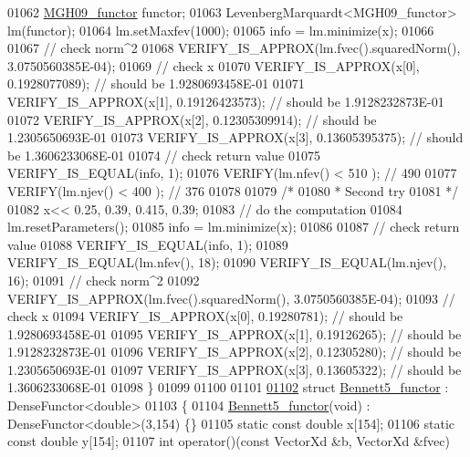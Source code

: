 \begin{DoxyCode}
01062   \hyperlink{struct_m_g_h09__functor}{MGH09\_functor} functor;
01063   LevenbergMarquardt<MGH09\_functor> lm(functor);
01064   lm.setMaxfev(1000);
01065   info = lm.minimize(x);
01066 
01067   \textcolor{comment}{// check norm^2}
01068   VERIFY\_IS\_APPROX(lm.fvec().squaredNorm(), 3.0750560385E-04);
01069   \textcolor{comment}{// check x}
01070   VERIFY\_IS\_APPROX(x[0], 0.1928077089); \textcolor{comment}{// should be 1.9280693458E-01}
01071   VERIFY\_IS\_APPROX(x[1], 0.19126423573); \textcolor{comment}{// should be 1.9128232873E-01}
01072   VERIFY\_IS\_APPROX(x[2], 0.12305309914); \textcolor{comment}{// should be 1.2305650693E-01}
01073   VERIFY\_IS\_APPROX(x[3], 0.13605395375); \textcolor{comment}{// should be 1.3606233068E-01}
01074   \textcolor{comment}{// check return value}
01075   VERIFY\_IS\_EQUAL(info, 1); 
01076   VERIFY(lm.nfev() < 510 ); \textcolor{comment}{// 490}
01077   VERIFY(lm.njev() < 400 ); \textcolor{comment}{// 376}
01078 
01079   \textcolor{comment}{/*}
01080 \textcolor{comment}{   * Second try}
01081 \textcolor{comment}{   */}
01082   x<< 0.25, 0.39, 0.415, 0.39;
01083   \textcolor{comment}{// do the computation}
01084   lm.resetParameters();
01085   info = lm.minimize(x);
01086 
01087   \textcolor{comment}{// check return value}
01088   VERIFY\_IS\_EQUAL(info, 1);
01089   VERIFY\_IS\_EQUAL(lm.nfev(), 18);
01090   VERIFY\_IS\_EQUAL(lm.njev(), 16);
01091   \textcolor{comment}{// check norm^2}
01092   VERIFY\_IS\_APPROX(lm.fvec().squaredNorm(), 3.0750560385E-04);
01093   \textcolor{comment}{// check x}
01094   VERIFY\_IS\_APPROX(x[0], 0.19280781); \textcolor{comment}{// should be 1.9280693458E-01}
01095   VERIFY\_IS\_APPROX(x[1], 0.19126265); \textcolor{comment}{// should be 1.9128232873E-01}
01096   VERIFY\_IS\_APPROX(x[2], 0.12305280); \textcolor{comment}{// should be 1.2305650693E-01}
01097   VERIFY\_IS\_APPROX(x[3], 0.13605322); \textcolor{comment}{// should be 1.3606233068E-01}
01098 \}
01099 
01100 
01101 
\hyperlink{struct_bennett5__functor}{01102} \textcolor{keyword}{struct }\hyperlink{struct_bennett5__functor}{Bennett5\_functor} : DenseFunctor<double>
01103 \{
01104     \hyperlink{struct_bennett5__functor}{Bennett5\_functor}(\textcolor{keywordtype}{void}) : DenseFunctor<double>(3,154) \{\}
01105     \textcolor{keyword}{static} \textcolor{keyword}{const} \textcolor{keywordtype}{double} x[154];
01106     \textcolor{keyword}{static} \textcolor{keyword}{const} \textcolor{keywordtype}{double} y[154];
01107     \textcolor{keywordtype}{int} operator()(\textcolor{keyword}{const} VectorXd &b, VectorXd &fvec)

\end{DoxyCode}

